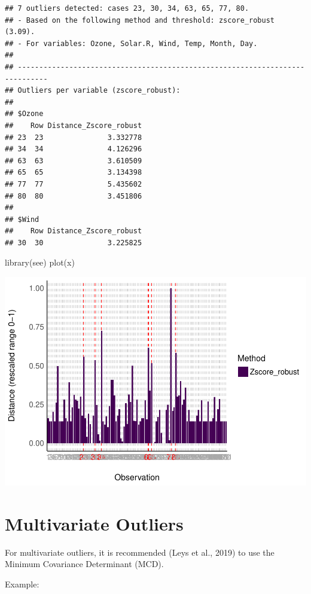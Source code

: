 \documentclass[
]{article}
\newenvironment{Shaded}{\begin{snugshade}}{\end{snugshade}}
\newcommand{\FunctionTok}[1]{\textcolor[rgb]{0.00,0.00,0.00}{#1}}
\newcommand{\NormalTok}[1]{#1}
\begin{document}
\begin{verbatim}
## 7 outliers detected: cases 23, 30, 34, 63, 65, 77, 80.
## - Based on the following method and threshold: zscore_robust (3.09).
## - For variables: Ozone, Solar.R, Wind, Temp, Month, Day.
## 
## -----------------------------------------------------------------------------
## Outliers per variable (zscore_robust): 
## 
## $Ozone
##    Row Distance_Zscore_robust
## 23  23               3.332778
## 34  34               4.126296
## 63  63               3.610509
## 65  65               3.134398
## 77  77               5.435602
## 80  80               3.451806
## 
## $Wind
##    Row Distance_Zscore_robust
## 30  30               3.225825
\end{verbatim}

\begin{Shaded}
\begin{Highlighting}[]
\FunctionTok{library}\NormalTok{(see)}
\FunctionTok{plot}\NormalTok{(x)}
\end{Highlighting}
\end{Shaded}

\includegraphics{paper_files/figure-latex/univariate outliers-1.pdf}

\hypertarget{multivariate-outliers}{%
\section{Multivariate Outliers}\label{multivariate-outliers}}

For multivariate outliers, it is recommended (Leys et al., 2019) to use
the Minimum Covariance Determinant (MCD).

Example:
\end{document}
